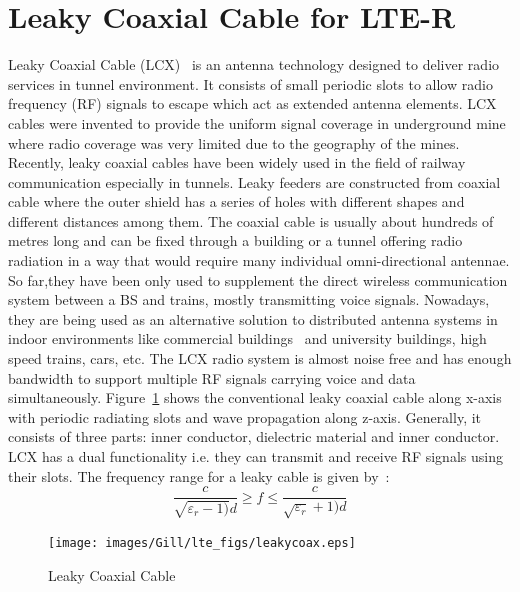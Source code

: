 \section{Leaky Coaxial Cable for LTE-R}
Leaky Coaxial Cable (LCX)~\cite{n1974leaky} is an antenna technology designed to deliver radio services in tunnel environment. It consists of small periodic slots to allow radio frequency (RF) signals to escape which act as extended antenna elements. LCX cables were invented to provide the uniform signal coverage in underground mine where radio coverage was very limited due to the geography of the mines. Recently, leaky coaxial cables have been widely used in the field of railway communication especially in tunnels. Leaky feeders are
constructed from coaxial cable where the outer shield has a series of holes with different shapes and different distances among them. The coaxial cable is usually about hundreds of metres long and can be fixed through a building or a tunnel offering radio radiation in a way that would require many individual omni-directional antennae. So far,they have been only used to supplement the direct wireless communication system between a BS and trains, mostly transmitting voice signals. Nowadays, they are being used as an alternative solution to distributed antenna systems in indoor environments like commercial buildings~\cite{motley1983directed,saleh1987distributed} and university buildings, high speed trains, cars, etc. The LCX radio system is almost noise free and has enough bandwidth to support multiple RF signals carrying voice and data simultaneously. Figure~\ref{fig:leakcoax} shows the conventional leaky coaxial cable along x-axis with periodic radiating slots and wave propagation along z-axis. Generally, it consists of three parts: inner conductor, dielectric material and inner conductor. LCX has a dual functionality i.e. they can transmit and receive RF signals using their slots. The frequency range for a leaky cable is given by~\cite{cao1999radio}:
\begin{equation}
\dfrac{c}{\sqrt{\varepsilon_r-1)}d}\geq f \leq \dfrac{c}{\sqrt{\varepsilon_r}+1)d}
\end{equation}

\begin{figure}[!ht]
\label{fig:leakcoax}
\centering
\texttt{[image: images/Gill/lte\_figs/leakycoax.eps]} 
\caption{Leaky Coaxial Cable}
\end{figure}

